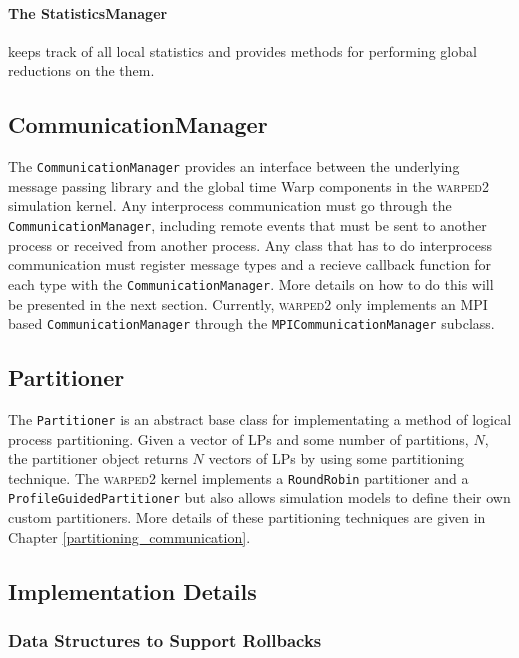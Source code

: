 \documentclass[11pt]{book}
\begin{document}
\paragraph{The StatisticsManager} keeps track of all local statistics and provides methods for
performing global reductions on the them.  

\subsection{CommunicationManager}

The \texttt{CommunicationManager} provides an interface between the underlying message passing
library and the global time Warp components in the \textsc{warped2} simulation kernel.  Any
interprocess communication must go through the \texttt{CommunicationManager}, including remote
events that must be sent to another process or received from another process.  Any class that has to
do interprocess communication must register message types and a recieve callback function for each
type with the \texttt{CommunicationManager}.  More details on how to do this will be presented in
the next section. Currently, \textsc{warped2} only implements an MPI based
\texttt{CommunicationManager} through the \texttt{MPICommunicationManager} subclass.

\subsection{Partitioner}

The \texttt{Partitioner} is an abstract base class for implementating a method of logical process
partitioning.  Given a vector of LPs and some number of partitions, $N$, the partitioner object
returns $N$ vectors of LPs by using some partitioning technique.  The \textsc{warped2} kernel
implements a \texttt{RoundRobin} partitioner and a \texttt{ProfileGuidedPartitioner} but also allows
simulation models to define their own custom partitioners.  More details of these partitioning
techniques are given in Chapter \ref{partitioning_communication}.

\subsection{Implementation Details}

\subsubsection[Rollbacks \& Cancellation]{Data Structures to Support Rollbacks}
\end{document}
